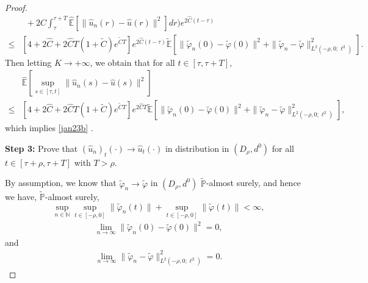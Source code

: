 \documentclass[11pt]{article}
\numberwithin{equation}{section}
\theoremstyle{plain}
\begin{document}
\begin{proof}
\begin{align*}
      & \  \
                 + 2 \hat{C} \int_{\tau}^{\tau + T}
                    \widehat{\mathbb{E}}
                         \left[ \|\hat{u}_n(r) - \hat{u}(r)\|^2 \right] dr
           \bigg) e^{2 \hat{C}(t-\tau)} \nonumber\\
 \le & \left[ 4 + 2 \hat{C} 
                       + 2 \widehat{C} T(1 + \widetilde{C} ) e^{\widetilde{C} T}
           \right] 
           e^{2 \hat{C}(t-\tau)}
             \widetilde{\mathbb{E}} 
                  \left[ \| {\widetilde{\varphi}}_n(0) - \widetilde{\varphi}(0) \|^2  
                            + \| {\widetilde{\varphi}}_n - \widetilde{\varphi} \|^2_{L^2(-\rho, 0; \ell^2)}     
                  \right].
 \end{align*}
 Then letting $K \to +\infty$, we obtain that for all $t \in [\tau, \tau+T]$,
 \begin{align*}
      & \widehat{\mathbb{E}}
             \left[ \sup_{s \in [\tau, t]}
                            \| \hat{u}_n(s) - \hat{u}(s) \|^2
             \right] \\
\le & \left[ 4 + 2 \hat{C} 
                     + 2 \widehat{C} T(1 + \widetilde{C} ) e^{\widetilde{C} T}
           \right] 
           e^{2 \hat{C}T}
           \widetilde{\mathbb{E}} 
                \left[ \| {\widetilde{\varphi}}_n(0) - \widetilde{\varphi}(0) \|^2  
                         + \| {\widetilde{\varphi}}_n - \widetilde{\varphi} \|^2_{L^2(-\rho, 0; \ell^2)}     
                \right],
 \end{align*}
 which implies 
 \eqref{jan23b} .
  
 
 {\bf Step 3:} Prove that $ (\hat{u}_{n})_t(\cdot) \to \hat{u}_{t}(\cdot) $ in distribution in $(D_{\rho}, d^0)$ for 
 all $ t \in [\tau+ {{} \rho}, \tau+T]$ with
  {{}$T > \rho$.}
  
 By assumption, we know that
 $ {\widetilde{\varphi} }_n \to  \widetilde{\varphi}$ in $(D_\rho, d^0)$ 
 $\widetilde{\mathbb{P}}$-almost surely,
 and hence we have,
 $\widetilde{\mathbb{P}}$-almost surely,
 $$ \sup_{n \in \mathbb{N}}
            \sup_{t \in [-\rho,0]}
                 \| {\widetilde{\varphi}}_n (t) \|
      + \sup_{t\in [-\rho,0]}
              \| \widetilde{\varphi }(t) \|
     < \infty,
$$
\begin{align} \label{jan23d}
 \lim_{n \to \infty}
     \| {\widetilde{\varphi} }_n  (0) - \widetilde{\varphi} (0)\|^2 = 0,
\end{align}
and
\begin{align} \label{jan23e}
 \lim_{n \to \infty}
      \| {\widetilde{\varphi}}_n - \widetilde{\varphi} \|^2_{L^2(-\rho, 0; \ell^2)}
  = 0.
\end{align}


\end{proof}
\end{document}
